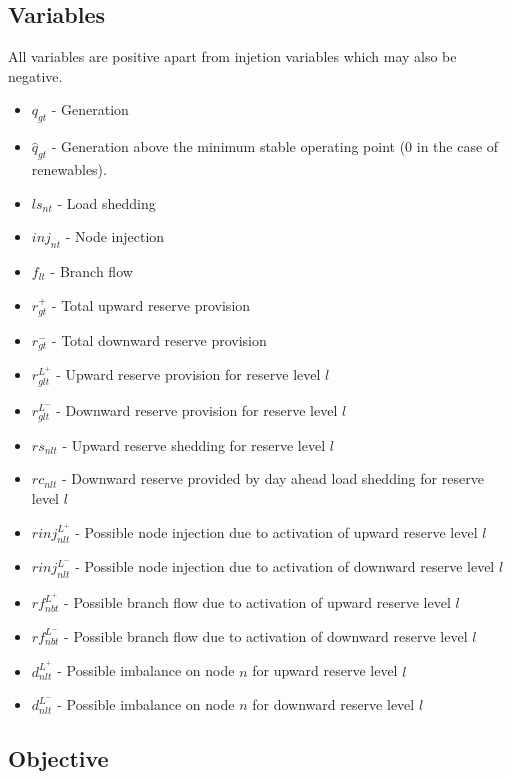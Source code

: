 \documentclass[number,times]{elsarticle}
\begin{document}
\subsection{Variables}

All variables are positive apart from injetion variables which may also be negative.

\begin{itemize}
    \item $q_{gt}$ - Generation
    \item $\hat{q}_{gt}$ - Generation above the minimum stable operating point (0 in the case of renewables).
    \item $ls_{nt}$ - Load shedding
    \item $inj_{nt}$ - Node injection
    \item $f_{lt}$ - Branch flow
    \item $r^+_{gt}$ - Total upward reserve provision
    \item $r^-_{gt}$ - Total downward reserve provision
    \item $r^{L^+}_{glt}$ - Upward reserve provision for reserve level $l$
    \item $r^{L^-}_{glt}$ - Downward reserve provision for reserve level $l$
    \item $rs_{nlt}$ - Upward reserve shedding for reserve level $l$
    \item $rc_{nlt}$ - Downward reserve provided by day ahead load shedding for reserve level $l$
    \item $rinj_{nlt}^{L^+}$ - Possible node injection due to activation of upward reserve level $l$
    \item $rinj_{nlt}^{L^-}$ - Possible node injection due to activation of downward reserve level $l$
    \item $rf_{nbt}^{L^+}$ - Possible branch flow due to activation of upward reserve level $l$
    \item $rf_{nbt}^{L^-}$ - Possible branch flow due to activation of downward reserve level $l$
    \item $d_{nlt}^{L^+}$ - Possible imbalance on node $n$ for upward reserve level $l$
    \item $d_{nlt}^{L^-}$ - Possible imbalance on node $n$ for downward reserve level $l$
\end{itemize}

\subsection{Objective}
\end{document}
